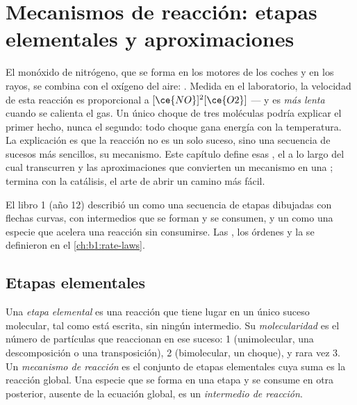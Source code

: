 \chapter{Mecanismos de reacción: etapas elementales y aproximaciones}\label{ch:b1:elementary-steps}

El monóxido de nitrógeno, que se forma en los motores de los coches y en
los rayos, se combina con el oxígeno del aire: .
Medida en el laboratorio, la velocidad de esta reacción es proporcional a
$[\ce{NO}]^2[\ce{O2}]$ --- y es \emph{más lenta} cuando se calienta el
gas. Un único choque de tres moléculas podría explicar el primer hecho,
nunca el segundo: todo choque gana energía con la temperatura. La
explicación es que la reacción no es un solo suceso, sino una secuencia
de sucesos más sencillos, su mecanismo. Este capítulo define esas , el  a lo largo del cual transcurren y las
aproximaciones que convierten un mecanismo en una ;
termina con la catálisis, el arte de abrir un camino más fácil.

\begin{recall}
El libro 1 (año 12) describió un  como una secuencia
de etapas dibujadas con flechas curvas, con intermedios que se forman y
se consumen, y un  como una especie que acelera una reacción
sin consumirse. Las , los órdenes y la 
se definieron en el
\cref{ch:b1:rate-laws}.
\end{recall}

\section{Etapas elementales}

\begin{definition}\label{def:b1:elementary-steps:elementary-step}
Una \emph{etapa elemental} es una reacción que
tiene lugar en un único suceso molecular, tal como está escrita, sin
ningún intermedio. Su \emph{molecularidad} es el
número de partículas que reaccionan en ese suceso: 1 (unimolecular, una
descomposición o una transposición), 2 (bimolecular, un choque), y rara
vez 3. Un \emph{mecanismo de reacción} es el
conjunto de etapas elementales cuya suma es la reacción global. Una
especie que se forma en una etapa y se consume en otra posterior, ausente
de la ecuación global, es un \emph{intermedio de
reacción}.
\end{definition}

